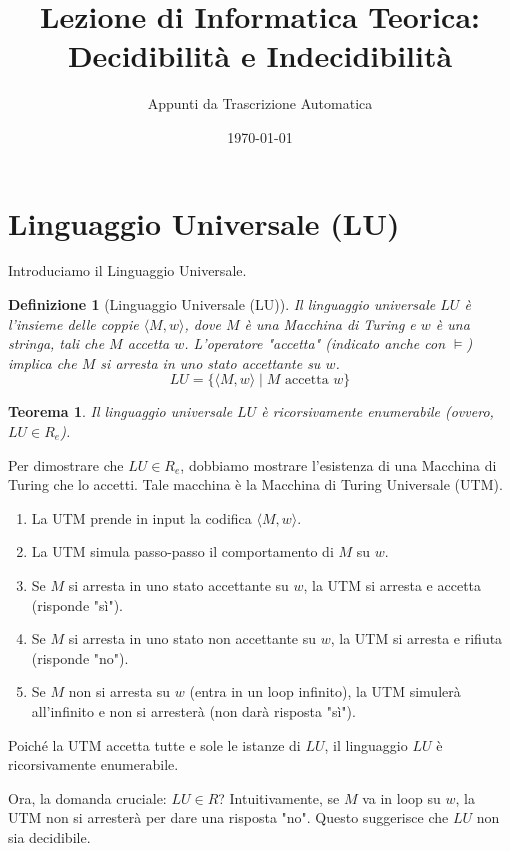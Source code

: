 \documentclass[a4paper]{article}
\title{Lezione di Informatica Teorica: Decidibilità e Indecidibilità}
\author{Appunti da Trascrizione Automatica}
\date{\today}
\makeatletter
\newtheorem{theorem}{Teorema}[section] %
\newtheorem{definition}{Definizione}[section] %
\renewenvironment{proof}[1][\proofname]{\par
  \pushQED{\qed}%
  \normalfont \topsep6\p@\@plus6\p@\relax
  \trivlist
  \item[\hskip\labelsep
        \bfseries
    #1\@addpunct{.}]\ignorespaces
}{%
  \popQED\endtrivlist\@endpefalse
}
\makeatother
\begin{document}
\maketitle
\tableofcontents
\newpage

\section{Linguaggio Universale (LU)}

Introduciamo il Linguaggio Universale.
\begin{definition}[Linguaggio Universale (LU)]
Il linguaggio universale $LU$ è l'insieme delle coppie $\langle M, w \rangle$, dove $M$ è una Macchina di Turing e $w$ è una stringa, tali che $M$ accetta $w$. L'operatore "accetta" (indicato anche con $\models$) implica che $M$ si arresta in uno stato accettante su $w$.
\[ LU = \{ \langle M, w \rangle \mid M \text{ accetta } w \} \]
\end{definition}

\begin{theorem}
Il linguaggio universale $LU$ è ricorsivamente enumerabile (ovvero, $LU \in R_e$).
\end{theorem}
\begin{proof}
Per dimostrare che $LU \in R_e$, dobbiamo mostrare l'esistenza di una Macchina di Turing che lo accetti. Tale macchina è la Macchina di Turing Universale (UTM).
\begin{enumerate}
    \item La UTM prende in input la codifica $\langle M, w \rangle$.
    \item La UTM simula passo-passo il comportamento di $M$ su $w$.
    \item Se $M$ si arresta in uno stato accettante su $w$, la UTM si arresta e accetta (risponde "sì").
    \item Se $M$ si arresta in uno stato non accettante su $w$, la UTM si arresta e rifiuta (risponde "no").
    \item Se $M$ non si arresta su $w$ (entra in un loop infinito), la UTM simulerà all'infinito e non si arresterà (non darà risposta "sì").
\end{enumerate}
Poiché la UTM accetta tutte e sole le istanze di $LU$, il linguaggio $LU$ è ricorsivamente enumerabile.
\end{proof}

Ora, la domanda cruciale: $LU \in R$? Intuitivamente, se $M$ va in loop su $w$, la UTM non si arresterà per dare una risposta "no". Questo suggerisce che $LU$ non sia decidibile.
\end{document}
